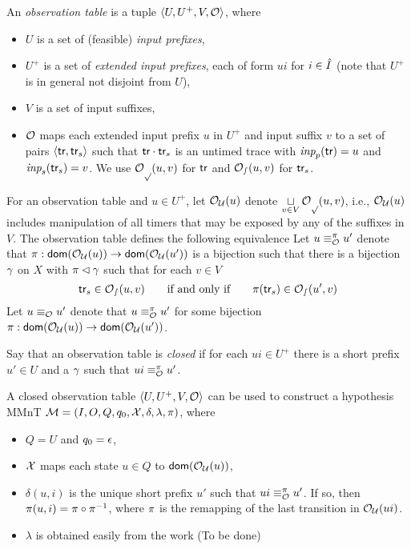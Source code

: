 \begin{definition}
  An \emph{observation table} is a tuple
  $\langle U,U^+,V,{\cal O}\rangle$, where
  \begin{itemize}
  \item $U$ is a set of (feasible) {\em input prefixes},
  \item $U^+$ is a set of {\em extended input prefixes}, each of form $ui$ for
    $i \in \hat{I}$ (note that $U^+$ is in general not disjoint from $U$),
  \item
    $V$ is a set of input suffixes,
  \item
    ${\cal O}$ maps each extended input prefix $u$ in $U^+$ and input suffix $v$
    to a set of pairs $\langle \textsf{tr},\textsf{tr}_s\rangle$ such that 
    $\textsf{tr}\cdot\textsf{tr}_s$ is an untimed trace with
$\textit{inp}_p(\textsf{tr}) = u$ and $\textit{inp}_s(\textsf{tr}_s) = v$.
   We use ${\cal O_p}(u,v)$ for $\textsf{tr}$ and 
   ${\cal O_s}(u,v)$ for $\textsf{tr}_s$.
  \end{itemize}
\end{definition}
For an observation table and $u \in U^+$,
let ${\cal O_U}(u)$ denote
\(
\displaystyle\mathop\sqcup_{v \in V}{\cal O_p}(u,v)
\),
i.e., ${\cal O_U}(u)$ includes manipulation of all timers that may be
exposed by any of the suffixes in $V$.
The observation table defines the following equivalence
Let $u \equiv_{{\cal O}}^{\pi} u'$ denote that
$\pi: {\textsf{dom}}({\cal O_U}(u)) \rightarrow {\textsf{dom}}({\cal O_U}(u'))$
is a bijection such that there is a bijection $\gamma$ on $X$ with
$\pi \lhd\gamma$ such that for each $v \in V$
\[
\textsf{tr}_s \in {\cal O_s}(u,v)
\qquad \mbox{if and only if} \qquad
\pi(\textsf{tr}_s) \in {\cal O_s}(u',v)
\]
Let $u \equiv_{{\cal O}} u'$ denote that 
$u \equiv_{{\cal O}}^{\pi} u'$ for some bijection
$\pi: {\textsf{dom}}({\cal O_U}(u)) \rightarrow {\textsf{dom}}({\cal O_U}(u'))$.

Say that an observation table is {\em closed} if for each
$ui \in U^+$ there is a short prefix $u' \in U$ and a $\gamma$ such that
$ui \equiv_{{\cal O}}^{\pi} u'$.

A closed observation table $\langle U,U^+,V,{\cal O}\rangle$ can be used to construct
a hypothesis  MMnT ${\cal M} = (I, O, Q, q_0, \mathcal{X}, \delta, \lambda, \pi)$, where
\begin{itemize}
\item
  $Q = U$ and $q_0 = \epsilon$,
\item
  $\mathcal{X}$ maps each state $u \in Q$ to ${\textsf{dom}}({\cal O_U}(u))$,
\item
  $\delta(u,i)$ is the unique short prefix $u'$ such that
  $ui \equiv_{{\cal O}}^{\pi} u'$. If so, then
  $\pi(u,i) = \pi\circ\pi^{-1}$,
  where $\pi$ is the remapping of the last transition in
  ${\cal O_U}(ui)$.
  \item
$\lambda$ is obtained easily from the work (To be done)
\end{itemize}









